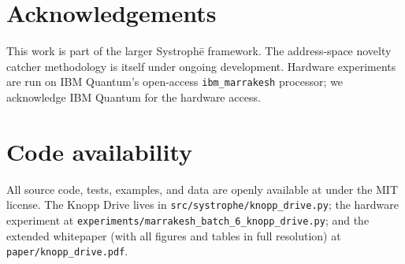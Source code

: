 \documentclass[11pt,a4paper]{article}
\begin{document}
\section*{Acknowledgements}

This work is part of the larger Systroph\=e framework. The address-space novelty catcher methodology is itself under ongoing development. Hardware experiments are run on IBM Quantum's open-access \texttt{ibm\_marrakesh} processor; we acknowledge IBM Quantum for the hardware access.

\section*{Code availability}

All source code, tests, examples, and data are openly available at \cite{SystropheRepo} under the MIT license. The Knopp Drive lives in \texttt{src/systrophe/knopp\_drive.py}; the hardware experiment at \texttt{experiments/marrakesh\_batch\_6\_knopp\_drive.py}; and the extended whitepaper (with all figures and tables in full resolution) at \texttt{paper/knopp\_drive.pdf}.
\end{document}
